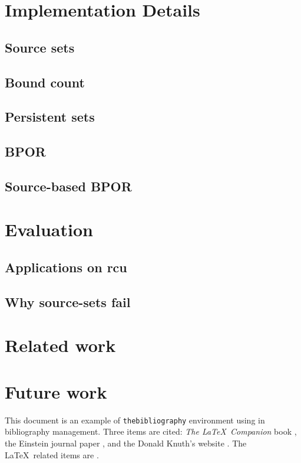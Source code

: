 \documentclass[a4paper,10pt]{article}
\begin{document}
\section{Implementation Details}

\subsection{Source sets}

\subsection{Bound count}

\subsection{Persistent sets}

\subsection{BPOR}

\subsection{Source-based BPOR}

\section{Evaluation}

\subsection{Applications on rcu}

\subsection{Why source-sets fail}

\section{Related work}

\section{Future work}





This document is an example of \texttt{thebibliography} environment using in bibliography management. Three items are cited: \textit{The \LaTeX\ Companion} book \cite{latexcompanion}, the Einstein journal paper \cite{einstein}, and the Donald Knuth's website \cite{knuthwebsite}. The \LaTeX\ related items are \cite{latexcompanion,knuthwebsite}. 
\end{document}
